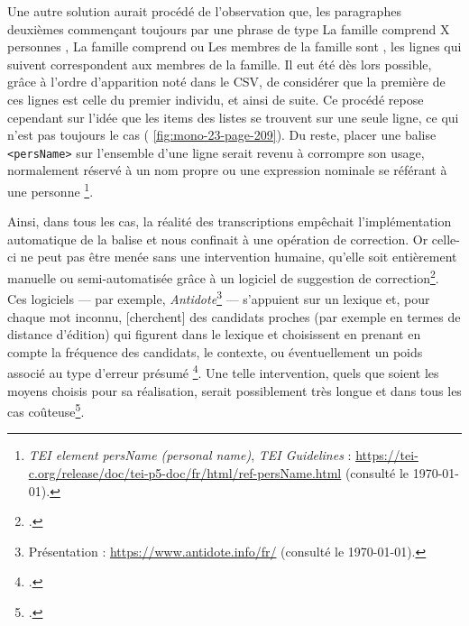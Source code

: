 Une autre solution aurait procédé de l'observation que, les paragraphes deuxièmes commençant toujours par une phrase de type \og La famille comprend X personnes \fg{}, \og La famille comprend \fg{} ou \og Les membres de la famille sont \fg{}, les lignes qui suivent correspondent aux membres de la famille. Il eut été dès lors possible, grâce à l'ordre d'apparition noté dans le CSV, de considérer que la première de ces lignes est celle du premier individu, et ainsi de suite. Ce procédé repose cependant sur l'idée que les items des listes se trouvent sur une seule ligne, ce qui n'est pas toujours le cas (\fig{} \ref{fig:mono-23-page-209}). Du reste, placer une balise \texttt{<persName>} sur l'ensemble d'une ligne serait revenu à corrompre son usage, normalement réservé à \og un nom propre ou une expression nominale se référant à une personne \fg{}\footnote{\textit{TEI element persName (personal name)}, \textit{TEI Guidelines} : \url{https://tei-c.org/release/doc/tei-p5-doc/fr/html/ref-persName.html} (consulté le \today).}.

Ainsi, dans tous les cas, la réalité des transcriptions empêchait l'implémentation automatique de la balise et nous confinait à une opération de correction.  Or celle-ci ne peut pas être menée sans une intervention humaine, qu'elle soit entièrement manuelle ou semi-automatisée grâce à un logiciel de suggestion de correction\footcite[p. 1]{sagot}. Ces logiciels --- par exemple, \textit{Antidote}\footnote{Présentation : \url{https://www.antidote.info/fr/} (consulté le \today).} --- s'appuient sur un lexique et, \og pour chaque mot inconnu, [cherchent] des candidats proches (par exemple en termes de distance d’édition) qui figurent dans le lexique et choisissent en prenant en compte la fréquence des candidats, le contexte, ou éventuellement un poids associé au type d’erreur présumé \fg{}\footcite[p. 1-2]{sagot}. Une telle intervention, quels que soient les moyens choisis pour sa réalisation, serait possiblement très longue et dans tous les cas coûteuse\footcite[p. 14]{en-tal}.


